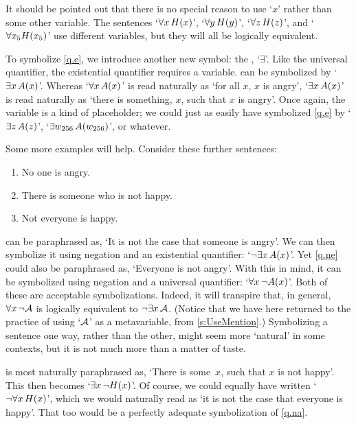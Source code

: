 It should be pointed out that there is no special reason to use `$x$' rather than some other variable. The sentences `$\forall x\, H(x)$', `$\forall y\, H(y)$', `$\forall z\, H(z)$', and `$\forall x_5 H(x_5)$' use different variables, but they will all be logically equivalent.

To symbolize \cref*{q.e}, we introduce another new symbol: the , `$\exists$'. Like the universal quantifier, the existential quantifier requires a variable.  can be symbolized by `$\exists x\,A(x)$'. Whereas `$\forall x\,A(x)$' is read naturally as `for all $x$, $x$ is angry', `$\exists x\,A(x)$' is read naturally as `there is something, $x$, such that $x$ is angry'. Once again, the variable is a kind of placeholder; we could just as easily have symbolized \cref*{q.e} by `$\exists z\, A(z)$', `$\exists w_{256}\, A(w_{256})$', or whatever.


Some more examples will help. Consider these further sentences:
	\begin{enumerate}
		\item\label{q.ne} No one is angry.
		\item\label{q.en} There is someone who is not happy.
		\item\label{q.na} Not everyone is happy.
	\end{enumerate}
 can be paraphrased as, `It is not the case that someone is angry'. We can then symbolize it using negation and an existential quantifier: `$\neg \exists x\,A(x)$'. Yet \cref*{q.ne} could also be paraphrased as, `Everyone is not angry'. With this in mind, it can be symbolized using negation and a universal quantifier: `$\forall x\, \neg A(x)$'. Both of these are acceptable symbolizations.  Indeed, it will transpire that, in general, $\forall x\, \neg\mathcal{A}$ is logically equivalent to $\neg\exists x\,\mathcal{A}$. (Notice that we have here returned to the practice of using `$\mathcal{A}$' as a metavariable, from \cref{s:UseMention}.) Symbolizing a sentence one way, rather than the other, might seem more `natural' in some contexts, but it is not much more than a matter of taste.

 is most naturally paraphrased as, `There is some~$x$, such that $x$ is not happy'. This then becomes `$\exists x\, \neg H(x)$'. Of course, we could equally have written `$\neg\forall x\,H(x)$', which we would naturally read as `it is not the case that everyone is happy'. That too would be a perfectly adequate symbolization of \cref*{q.na}.


